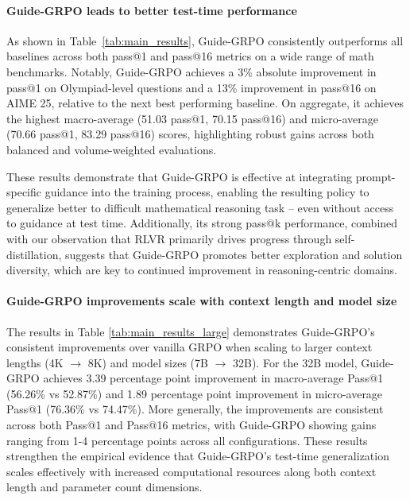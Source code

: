 \documentclass{article}
\begin{document}
\paragraph{Guide-GRPO leads to better test-time performance} As shown in Table \ref{tab:main_results}, Guide-GRPO consistently outperforms all baselines across both pass@1 and pass@16 metrics on a wide range of math benchmarks. Notably, Guide-GRPO achieves a 3\% absolute improvement in pass@1 on Olympiad-level questions and a 13\% improvement in pass@16 on AIME 25, relative to the next best performing baseline. On aggregate, it achieves the highest macro-average (51.03 pass@1, 70.15 pass@16) and micro-average (70.66 pass@1, 83.29 pass@16) scores, highlighting robust gains across both balanced and volume-weighted evaluations.

These results demonstrate that Guide-GRPO is effective at integrating prompt-specific guidance into the training process, enabling the resulting policy to generalize better to difficult mathematical reasoning task -- even without access to guidance at test time. Additionally, its strong pass@k performance, combined with our observation that RLVR primarily drives progress through self-distillation, suggests that Guide-GRPO promotes better exploration and solution diversity, which are key to continued improvement in reasoning-centric domains.

\paragraph{Guide-GRPO improvements scale with context length and model size}
The results in Table \ref{tab:main_results_large} demonstrates Guide-GRPO's consistent improvements over vanilla GRPO when scaling to larger context lengths (4K $\xrightarrow{}$ 8K) and model sizes (7B $\xrightarrow{}$ 32B). For the 32B model, Guide-GRPO achieves 3.39 percentage point improvement in macro-average Pass@1 (56.26\% vs 52.87\%) and 1.89 percentage point improvement in micro-average Pass@1 (76.36\% vs 74.47\%). More generally, the improvements are consistent across both Pass@1 and Pass@16 metrics, with Guide-GRPO showing gains ranging from 1-4 percentage points across all configurations. These results strengthen the empirical evidence that Guide-GRPO's test-time generalization scales effectively with increased computational resources along both context length and parameter count dimensions.
\end{document}
